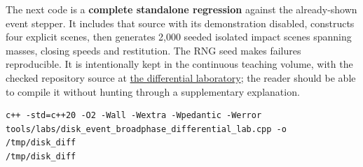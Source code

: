 The next code is a \textbf{complete standalone regression} against the already-shown event stepper. It includes that source with its demonstration  disabled, constructs four explicit scenes, then generates 2,000 seeded isolated impact scenes spanning masses, closing speeds and restitution. The RNG seed makes failures reproducible. It is intentionally kept in the continuous teaching volume, with the checked repository source at \hyperref[source-file-352cdda3503a7fe277bf96f6]{the differential laboratory}; the reader should be able to compile it without hunting through a supplementary explanation.

\begin{verbatim}
c++ -std=c++20 -O2 -Wall -Wextra -Wpedantic -Werror tools/labs/disk_event_broadphase_differential_lab.cpp -o /tmp/disk_diff
/tmp/disk_diff
\end{verbatim}


